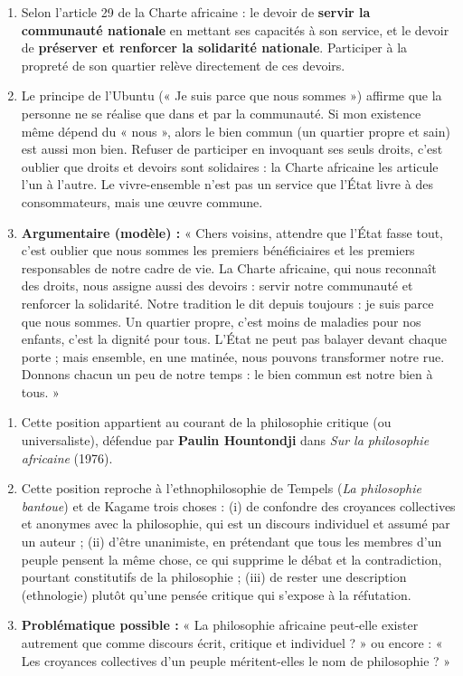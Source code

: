 \documentclass[11pt]{article}
\newcommand{\cle}[1]{{\popxbold\color{popdark}#1}}
\begin{document}
\begin{corrige}
\begin{enumerate}
\item Selon l'article 29 de la Charte africaine : le devoir de \textbf{servir la communauté nationale} en mettant ses capacités à son service, et le devoir de \textbf{préserver et renforcer la solidarité nationale}. Participer à la propreté de son quartier relève directement de ces devoirs.
\item Le principe de l'\cle{Ubuntu} (« Je suis parce que nous sommes ») affirme que la personne ne se réalise que dans et par la communauté. Si mon existence même dépend du « nous », alors le bien commun (un quartier propre et sain) est aussi mon bien. Refuser de participer en invoquant ses seuls droits, c'est oublier que droits et devoirs sont solidaires : la Charte africaine les articule l'un à l'autre. Le vivre-ensemble n'est pas un service que l'État livre à des consommateurs, mais une œuvre commune.
\item \textbf{Argumentaire (modèle) :} « Chers voisins, attendre que l'État fasse tout, c'est oublier que nous sommes les premiers bénéficiaires et les premiers responsables de notre cadre de vie. La Charte africaine, qui nous reconnaît des droits, nous assigne aussi des devoirs : servir notre communauté et renforcer la solidarité. Notre tradition le dit depuis toujours : je suis parce que nous sommes. Un quartier propre, c'est moins de maladies pour nos enfants, c'est la dignité pour tous. L'État ne peut pas balayer devant chaque porte ; mais ensemble, en une matinée, nous pouvons transformer notre rue. Donnons chacun un peu de notre temps : le bien commun est notre bien à tous. »
\end{enumerate}
\end{corrige}

\begin{corrige}
\begin{enumerate}
\item Cette position appartient au courant de la \cle{philosophie critique} (ou universaliste), défendue par \textbf{Paulin Hountondji} dans \emph{Sur la philosophie africaine} (1976).
\item Cette position reproche à l'ethnophilosophie de Tempels (\emph{La philosophie bantoue}) et de Kagame trois choses : (i) de confondre des croyances collectives et anonymes avec la philosophie, qui est un discours individuel et assumé par un auteur ; (ii) d'être unanimiste, en prétendant que tous les membres d'un peuple pensent la même chose, ce qui supprime le débat et la contradiction, pourtant constitutifs de la philosophie ; (iii) de rester une description (ethnologie) plutôt qu'une pensée critique qui s'expose à la réfutation.
\item \textbf{Problématique possible :} « La philosophie africaine peut-elle exister autrement que comme discours écrit, critique et individuel ? » ou encore : « Les croyances collectives d'un peuple méritent-elles le nom de philosophie ? »
\end{enumerate}
\end{corrige}
\end{document}
